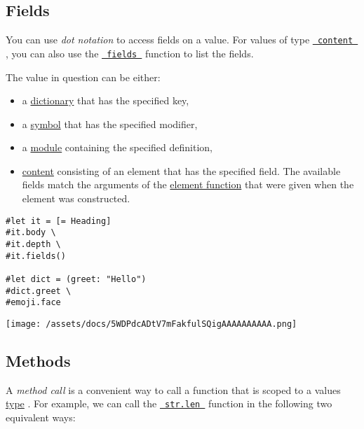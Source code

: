 \subsection{Fields}\label{fields}

You can use \emph{dot notation} to access fields on a value. For values
of type
\href{/docs/reference/foundations/content/}{\texttt{\ content\ }} , you
can also use the
\href{/docs/reference/foundations/content/\#definitions-fields}{\texttt{\ fields\ }}
function to list the fields.

The value in question can be either:

\begin{itemize}
\tightlist
\item
  a \href{/docs/reference/foundations/dictionary/}{dictionary} that has
  the specified key,
\item
  a \href{/docs/reference/symbols/symbol/}{symbol} that has the
  specified modifier,
\item
  a \href{/docs/reference/foundations/module/}{module} containing the
  specified definition,
\item
  \href{/docs/reference/foundations/content/}{content} consisting of an
  element that has the specified field. The available fields match the
  arguments of the
  \href{/docs/reference/foundations/function/\#element-functions}{element
  function} that were given when the element was constructed.
\end{itemize}

\begin{verbatim}
#let it = [= Heading]
#it.body \
#it.depth \
#it.fields()

#let dict = (greet: "Hello")
#dict.greet \
#emoji.face
\end{verbatim}

\texttt{[image: /assets/docs/5WDPdcADtV7mFakfulSQigAAAAAAAAAA.png]}

\subsection{Methods}\label{methods}

A \emph{method call} is a convenient way to call a function that is
scoped to a value\textquotesingle s
\href{/docs/reference/foundations/type/}{type} . For example, we can
call the
\href{/docs/reference/foundations/str/\#definitions-len}{\texttt{\ str.len\ }}
function in the following two equivalent ways:

